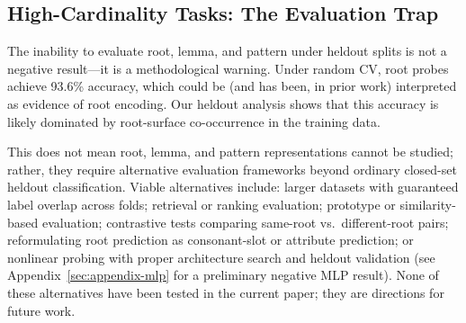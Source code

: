 \documentclass[11pt,a4paper]{article}
\begin{document}
\subsection{High-Cardinality Tasks: The Evaluation Trap}
The inability to evaluate root, lemma, and pattern under heldout splits is not a negative result---it is a methodological warning. Under random CV, root probes achieve 93.6\% accuracy, which could be (and has been, in prior work) interpreted as evidence of root encoding. Our heldout analysis shows that this accuracy is likely dominated by root-surface co-occurrence in the training data.

This does not mean root, lemma, and pattern representations cannot be studied; rather, they require alternative evaluation frameworks beyond ordinary closed-set heldout classification. Viable alternatives include: larger datasets with guaranteed label overlap across folds; retrieval or ranking evaluation; prototype or similarity-based evaluation; contrastive tests comparing same-root vs.\ different-root pairs; reformulating root prediction as consonant-slot or attribute prediction; or nonlinear probing with proper architecture search and heldout validation (see Appendix~\ref{sec:appendix-mlp} for a preliminary negative MLP result). None of these alternatives have been tested in the current paper; they are directions for future work.

\end{document}
